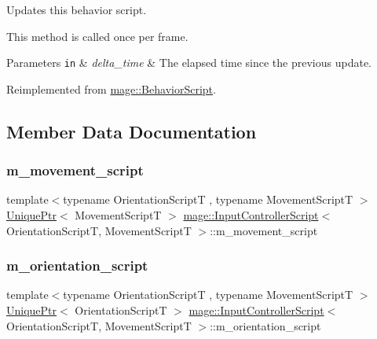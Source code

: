 Updates this behavior script.

This method is called once per frame.


\begin{DoxyParams}[1]{Parameters}
\mbox{\tt in}  & {\em delta\+\_\+time} & The elapsed time since the previous update. \\
\hline
\end{DoxyParams}


Reimplemented from \hyperlink{classmage_1_1_behavior_script_afb9cf3759edf8876416d1df85489cba6}{mage\+::\+Behavior\+Script}.



\subsection{Member Data Documentation}
\hypertarget{classmage_1_1_input_controller_script_aea0478602dbabf616dd3ef8b4408a42a}{}\label{classmage_1_1_input_controller_script_aea0478602dbabf616dd3ef8b4408a42a} 
\subsubsection{\texorpdfstring{m\+\_\+movement\+\_\+script}{m\_movement\_script}}
{\footnotesize\ttfamily template$<$typename Orientation\+ScriptT , typename Movement\+ScriptT $>$ \\
\hyperlink{namespacemage_a3316d7143a973e37adf1110f2e80ca31}{Unique\+Ptr}$<$ Movement\+ScriptT $>$ \hyperlink{classmage_1_1_input_controller_script}{mage\+::\+Input\+Controller\+Script}$<$ Orientation\+ScriptT, Movement\+ScriptT $>$\+::m\+\_\+movement\+\_\+script\hspace{0.3cm}{\ttfamily [private]}}

\hypertarget{classmage_1_1_input_controller_script_ab5af05a3bf7cdd672382dd5bcb1d6d02}{}\label{classmage_1_1_input_controller_script_ab5af05a3bf7cdd672382dd5bcb1d6d02} 
\subsubsection{\texorpdfstring{m\+\_\+orientation\+\_\+script}{m\_orientation\_script}}
{\footnotesize\ttfamily template$<$typename Orientation\+ScriptT , typename Movement\+ScriptT $>$ \\
\hyperlink{namespacemage_a3316d7143a973e37adf1110f2e80ca31}{Unique\+Ptr}$<$ Orientation\+ScriptT $>$ \hyperlink{classmage_1_1_input_controller_script}{mage\+::\+Input\+Controller\+Script}$<$ Orientation\+ScriptT, Movement\+ScriptT $>$\+::m\+\_\+orientation\+\_\+script\hspace{0.3cm}{\ttfamily [private]}}

